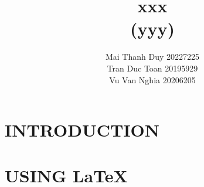 \documentclass[twocolumn]{article}
\begin{document}
\title{xxx\\(yyy)}
\author{
Mai Thanh Duy 20227225 \\
Tran Duc Toan 20195929 \\
Vu Van Nghia 20206205
}
\maketitle


\section{INTRODUCTION}


% 

% 

% 

% 

 


\renewcommand{\refname}{REFERENCES}

 
\section{USING \LaTeX}

\end{document}
